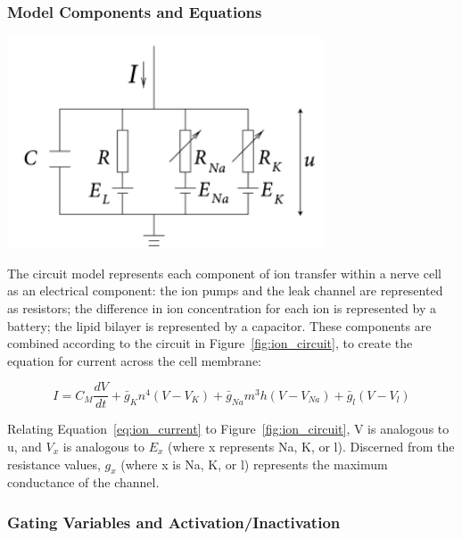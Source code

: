 \documentclass{article} %
\begin{document}
\begin{multicols}{2}
\subsubsection{Model Components and Equations}
\label{subsubsec:hh_equations}

\begin{minipage}{\linewidth}
    \centering
    \includegraphics[width=0.9\linewidth]{Figs/ion_circuit.png}
    \label{fig:ion_circuit}
\end{minipage}

The circuit model represents each component of ion transfer within a nerve cell as an electrical component: 
the ion pumps and the leak channel are represented as resistors; the difference in ion concentration for each ion is represented by a battery; the lipid bilayer is represented by a capacitor.
These components are combined according to the circuit in Figure~\ref{fig:ion_circuit}, to create the equation for current across the cell membrane:

\begin{dmath}
    I = C_{M}\frac{dV}{dt} + \bar{g}_{K}n^4(V - V_{K}) + \bar{g}_{Na}m^3h(V - V_{Na}) + \bar{g}_{l}(V - V_{l})
    \label{eq:ion_current}
\end{dmath}

Relating Equation~\ref{eq:ion_current} to Figure~\ref{fig:ion_circuit}, V is analogous to u, and $V_x$ is analogous to $E_x$ (where x represents Na, K, or l). Discerned from the resistance values, $g_x$ (where x is Na, K, or l) represents the maximum conductance of the channel.

\subsubsection{Gating Variables and Activation/Inactivation}
\label{subsubsec:gating_variables}


\end{multicols}
\end{document}
